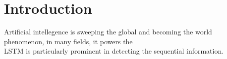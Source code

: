 \section{Introduction}
Artificial intellegence is sweeping the global and becoming the world phenomenon, in many fields, it powers the 
\\
LSTM is particularly prominent in detecting the sequential information. 